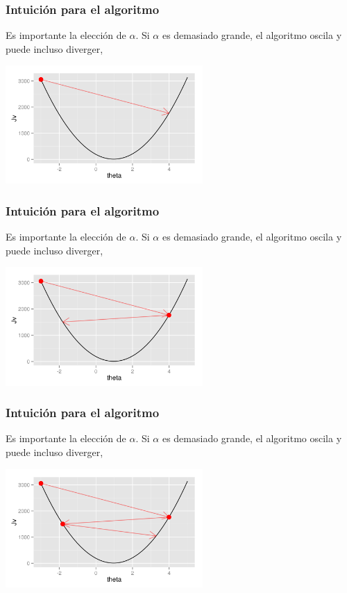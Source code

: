 \documentclass[aspectratio=169]{beamer}
\begin{document}
\begin{frame}
 \frametitle{Intuición para el algoritmo}
 \begin{overlayarea}{\textwidth}{8cm}
Es importante la elección de $\alpha$. Si $\alpha$ es demasiado grande, el algoritmo oscila y puede incluso diverger,
\begin{center}
  \includegraphics[height=4.5cm]{gradientdescent-bigalpha-2.png}
\end{center}
 \end{overlayarea}
\end{frame}

\begin{frame}
 \frametitle{Intuición para el algoritmo}
 \begin{overlayarea}{\textwidth}{8cm}
Es importante la elección de $\alpha$. Si $\alpha$ es demasiado grande, el algoritmo oscila y puede incluso diverger,
\begin{center}
  \includegraphics[height=4.5cm]{gradientdescent-bigalpha-3.png}
\end{center}
 \end{overlayarea}
\end{frame}

\begin{frame}
 \frametitle{Intuición para el algoritmo}
 \begin{overlayarea}{\textwidth}{8cm}
Es importante la elección de $\alpha$. Si $\alpha$ es demasiado grande, el algoritmo oscila y puede incluso diverger,
\begin{center}
  \includegraphics[height=4.5cm]{gradientdescent-bigalpha-4.png}
\end{center}
 \end{overlayarea}
\end{frame}
\end{document}
